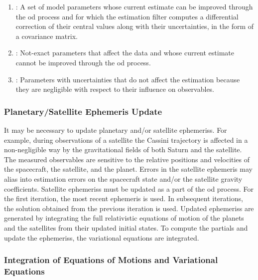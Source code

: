 \documentclass[oneside]{book}
\theoremstyle{mystyle}
\begin{document}
\begin{enumerate}[itemsep=0pt]
\item {}: A set of model parameters whose current estimate can be improved through the \gls{od} process and for which the estimation filter computes a differential correction of their central values along with their uncertainties, in the form of a \gls{covariance matrix}.
\item {}: Not-exact parameters that affect the data and whose current estimate cannot be improved through the \gls{od} process.
\item {}: Parameters with uncertainties that do not affect the estimation because they are negligible with respect to their influence on observables.
\end{enumerate}

\subsubsection{\footnotesize Planetary/Satellite Ephemeris Update}

It may be necessary to update planetary and/or satellite \glspl{ephemeris}. For example, during observations of a satellite the Cassini trajectory is affected in a non-negligible way by the \glspl{gravitational field} of both Saturn and the satellite. The measured observables are sensitive to the relative positions and velocities of the spacecraft, the satellite, and the planet. Errors in the satellite \gls{ephemeris} may alias into estimation errors on the spacecraft state and/or the satellite gravity coefficients. Satellite \glspl{ephemeris} must be updated as a part of the \gls{od} process. For the first iteration, the most recent \gls{ephemeris} is used. In subsequent iterations, the solution obtained from the previous iteration is used. Updated \glspl{ephemeris} are generated by integrating the full relativistic \gls{equations of motion} of the planets and the satellites from their updated initial states. To compute the partials and update the \glspl{ephemeris}, the \glspl{variational equation} are integrated.

\subsubsection{\footnotesize Integration of Equations of Motions and Variational Equations}
\end{document}
